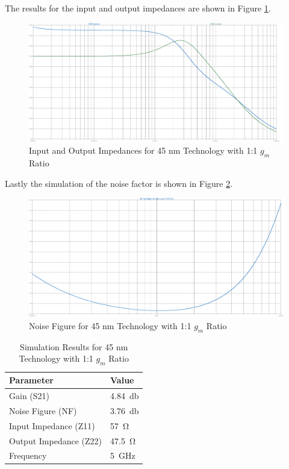The results for the input and output impedances are shown in Figure \ref{fig:ZParam45nm1to1}.

\begin{figure}[H]
    \centering
    \includegraphics[width=1\textwidth]{Images/Imp_45_1To1.png}
    \caption{Input and Output Impedances for 45 nm Technology with 1:1 $g_m$ Ratio}
    \label{fig:ZParam45nm1to1}
\end{figure}

Lastly the simulation of the noise factor is shown in Figure \ref{fig:Noise45nm1to1}.
\begin{figure}[H]
    \centering
    \includegraphics[width=1\textwidth]{Images/Noise_45_1To1.png}
    \caption{Noise Figure for 45 nm Technology with 1:1 $g_m$ Ratio}
    \label{fig:Noise45nm1to1}
\end{figure}

\begin{table}[H]
    \centering
    \caption{Simulation Results for 45 nm Technology with 1:1 $g_m$ Ratio}
    \begin{tabularx}{\textwidth}{>{\centering\arraybackslash}X >{\centering\arraybackslash}X }
        \toprule
        \textbf{Parameter} & \textbf{Value}\\
        \midrule
        Gain (S21) & \SI{4.84}{\decibel} \\
        \midrule
        Noise Figure (NF) & \SI{3.76}{\decibel} \\
        \midrule
        Input Impedance (Z11) & \SI{57}{\ohm} \\
        \midrule
        Output Impedance (Z22) & \SI{47.5}{\ohm} \\
        \midrule
        Frequency & \SI{5}{\giga \hertz} \\
        \bottomrule
    \end{tabularx}
    \label{tab:45nm_1to1_results}
\end{table}
